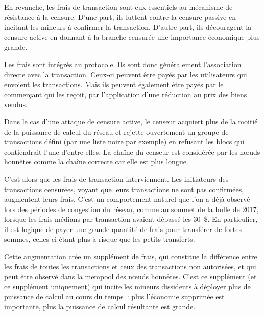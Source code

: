 En revanche, les frais de transaction sont eux essentiels au mécanisme de résistance à la censure. D'une part, ils luttent contre la censure passive en incitant les mineurs à confirmer la transaction. D'autre part, ils découragent la censure active en donnant à la branche censurée une importance économique plus grande.

Les frais sont intégrés au protocole. Ils sont donc généralement l'association directe avec la transaction. Ceux-ci peuvent être payés par les utilisateurs qui envoient les transactions. Mais ils peuvent également être payés par le commerçant qui les reçoit, par l'application d'une réduction au prix des biens vendus.

Dans le cas d'une attaque de censure active, le censeur acquiert plus de la moitié de la puissance de calcul du réseau et rejette ouvertement un groupe de transactions défini (par une liste noire par exemple) en refusant les blocs qui contiendrait l'une d'entre elles. La chaîne du censeur est considérée par les nœuds honnêtes comme la chaîne correcte car elle est plus longue.

C'est alors que les frais de transaction interviennent. Les initiateurs des transactions censurées, voyant que leurs transactions ne sont pas confirmées, augmentent leurs frais. C'est un comportement naturel que l'on a déjà observé lors des périodes de congestion du réseau, comme au sommet de la bulle de 2017, lorsque les frais médians par transaction avaient dépassé les 30~\$. En particulier, il est logique de payer une grande quantité de frais pour transférer de fortes sommes, celles-ci étant plus à risque que les petits transferts.

Cette augmentation crée un supplément de frais, qui constitue la différence entre les frais de toutes les transactions et ceux des transactions non autorisées, et qui peut être observé dans la mempool des nœuds honnêtes. C'est ce supplément (et ce supplément uniquement) qui incite les mineurs dissidents à déployer plus de puissance de calcul au cours du temps~: plus l'économie supprimée est importante, plus la puissance de calcul résultante est grande.

